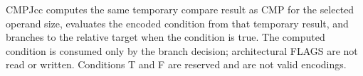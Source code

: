 CMPJcc computes the same temporary compare result as CMP for the selected operand size, evaluates the encoded condition from that temporary result, and branches to the relative target when the condition is true. The computed condition is consumed only by the branch decision; architectural FLAGS are not read or written. Conditions T and F are reserved and are not valid encodings.
